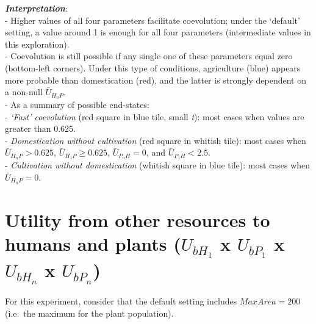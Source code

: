 \documentclass[]{book}
\begin{document}
\textbf{\emph{Interpretation}}:\\
- Higher values of all four parameters facilitate coevolution; under the `default' setting, a value around 1 is enough for all four parameters (intermediate values in this exploration).\\
- Coevolution is still possible if any single one of these parameters equal zero (bottom-left corners). Under this type of conditions, agriculture (blue) appears more probable than domestication (red), and the latter is strongly dependent on a non-null \(\bar{U}_{H_{n}P}\).\\
- As a summary of possible end-states:\\
- \emph{`Fast' coevolution} (red square in blue tile, small \emph{t}): most cases when values are greater than 0.625.\\
- \emph{Domestication without cultivation} (red square in whitish tile): most cases when \(\bar{U}_{H_{n}P}>0.625\), \(\bar{U}_{H_{1}P}\geq 0.625\), \(\bar{U}_{P_{n}H}=0\), and \(\bar{U}_{P_{1}H}<2.5\).\\
- \emph{Cultivation without domestication} (whitish square in blue tile): most cases when \(\bar{U}_{H_{n}P} = 0\).

\newpage

\hypertarget{utility-from-other-resources-to-humans-and-plants-u_bh_1-x-u_bp_1-x-u_bh_n-x-u_bp_n}{%
\section{\texorpdfstring{Utility from other resources to humans and plants (\(U_{bH_{1}}\) x \(U_{bP_{1}}\) x \(U_{bH_{n}}\) x \(U_{bP_{n}}\))}{Utility from other resources to humans and plants (U\_\{bH\_\{1\}\} x U\_\{bP\_\{1\}\} x U\_\{bH\_\{n\}\} x U\_\{bP\_\{n\}\})}}\label{utility-from-other-resources-to-humans-and-plants-u_bh_1-x-u_bp_1-x-u_bh_n-x-u_bp_n}}

For this experiment, consider that the default setting includes \(MaxArea=200\) (i.e.~the maximum for the plant population).
\end{document}
